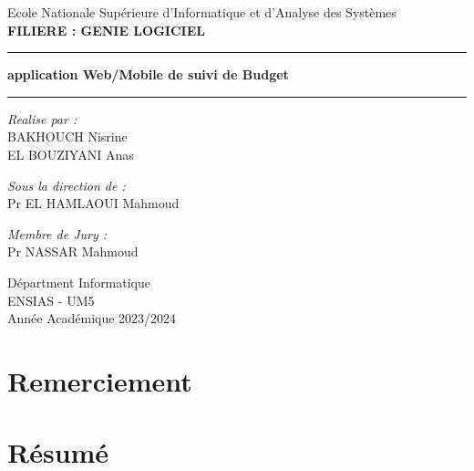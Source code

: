\documentclass[12pt,twoside]{report}
\begin{document}
\begin{titlepage}
\begin{center}
  \vspace{0.2cm}
  {\huge Ecole Nationale Supérieure d'Informatique et d'Analyse des Systèmes}\\
  \vspace{0.5cm}
  \textbf{FILIERE : GENIE LOGICIEL}
  \vspace{0.5cm}
  \hrule
  \vspace{0.2cm}
  \textbf{\huge application Web/Mobile de suivi de Budget}
  \vspace{0.5cm}
  \hrule
  \vspace{1.5cm}
  \vfill
  \begin{minipage}[t]{0.45\textwidth}    %
    \raggedright\textit{Realise par :}\\

        BAKHOUCH Nisrine\\
        EL BOUZIYANI Anas
    \end{minipage}%
    \begin{minipage}[t]{0.45\textwidth}    %
      \raggedright\textit{Sous la direction de :}\\
        
        Pr EL HAMLAOUI Mahmoud
        \\
        \raggedright\textit{Membre de Jury :}\\
        Pr NASSAR Mahmoud
    \end{minipage}%
       \vspace{1.8cm}
       Départment Informatique\\
       ENSIAS - UM5\\
       Année Académique 2023/2024
   \end{center}
\end{titlepage}
\shipout\null
{} %
\chapter*{Remerciement} %


\chapter*{Résumé} %

\end{document}
